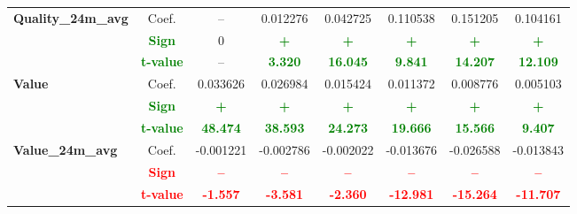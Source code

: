 \documentclass[11pt,english,a4paper,hidelinks]{book}
\begin{document}
\begin{table}[H]
\begin{tabular}{lccccccc}
        \midrule
        \multirow{3}{*}{\textbf{Quality\_24m\_avg}}
            & Coef.   & -- & 0.012276 & 0.042725 & 0.110538 & 0.151205 & 0.104161 \\
            & \textbf{\textcolor{green}{Sign}}    & 0 & \textbf{\textcolor{green}{+}} & \textbf{\textcolor{green}{+}} & \textbf{\textcolor{green}{+}} & \textbf{\textcolor{green}{+}} & \textbf{\textcolor{green}{+}} \\
            & \textbf{\textcolor{green}{t-value}} & -- & \textbf{\textcolor{green}{3.320}} & \textbf{\textcolor{green}{16.045}} & \textbf{\textcolor{green}{9.841}} & \textbf{\textcolor{green}{14.207}} & \textbf{\textcolor{green}{12.109}} \\
        \midrule
        \multirow{3}{*}{\textbf{Value}}
            & Coef.   & 0.033626  & 0.026984  & 0.015424  & 0.011372  & 0.008776  & 0.005103  \\
            & \textbf{\textcolor{green}{Sign}}    & \textbf{\textcolor{green}{+}}        & \textbf{\textcolor{green}{+}}        & \textbf{\textcolor{green}{+}}        & \textbf{\textcolor{green}{+}}        & \textbf{\textcolor{green}{+}}        & \textbf{\textcolor{green}{+}}        \\
            & \textbf{\textcolor{green}{t-value}} & \textbf{\textcolor{green}{48.474}}    & \textbf{\textcolor{green}{38.593}}    & \textbf{\textcolor{green}{24.273}}    & \textbf{\textcolor{green}{19.666}}    & \textbf{\textcolor{green}{15.566}}    & \textbf{\textcolor{green}{9.407}}    \\
        \midrule
        \multirow{3}{*}{\textbf{Value\_24m\_avg}} 
            & Coef.   & -0.001221 & -0.002786 & -0.002022 & -0.013676 & -0.026588 & -0.013843 \\
            & \textbf{\textcolor{red}{Sign}}    & \textbf{\textcolor{red}{–}}         & \textbf{\textcolor{red}{–}}         & \textbf{\textcolor{red}{–}}         & \textbf{\textcolor{red}{–}}         & \textbf{\textcolor{red}{–}}         & \textbf{\textcolor{red}{–}}         \\
            & \textbf{\textcolor{red}{t-value}} & \textbf{\textcolor{red}{-1.557}}    & \textbf{\textcolor{red}{-3.581}}    & \textbf{\textcolor{red}{-2.360}}    & \textbf{\textcolor{red}{-12.981}}   & \textbf{\textcolor{red}{-15.264}}   & \textbf{\textcolor{red}{-11.707}}   \\
        \bottomrule
    \end{tabular}
    \label{tab:south_america_windowed_consistency_summary}
\end{table}
\end{document}
